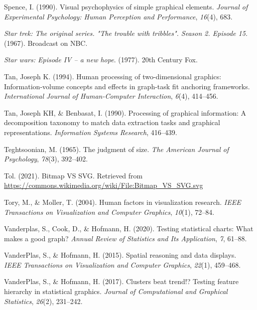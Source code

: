 \documentclass[print]{nuthesis}
\newlength{\cslhangindent}
\newenvironment{CSLReferences}[2]%
{\setlength{\parindent}{0pt}%
\everypar{\setlength{\hangindent}{\cslhangindent}}\ignorespaces}%
{\par}
\begin{document}
\begin{CSLReferences}{1}{0}
\leavevmode{}%
Spence, I. (1990). Visual psychophysics of simple graphical elements. \emph{Journal of Experimental Psychology: Human Perception and Performance}, \emph{16}(4), 683.

\leavevmode{}%
\emph{Star trek: The original series. "The trouble with tribbles". Season 2. Episode 15.} (1967). Broadcast on NBC.

\leavevmode{}%
\emph{Star wars: Episode IV -- a new hope}. (1977). 20th Century Fox.

\leavevmode{}%
Tan, Joseph K. (1994). Human processing of two-dimensional graphics: Information-volume concepts and effects in graph-task fit anchoring frameworks. \emph{International Journal of Human-Computer Interaction}, \emph{6}(4), 414--456.

\leavevmode{}%
Tan, Joseph KH, \& Benbasat, I. (1990). Processing of graphical information: A decomposition taxonomy to match data extraction tasks and graphical representations. \emph{Information Systems Research}, 416--439.

\leavevmode{}%
Teghtsoonian, M. (1965). The judgment of size. \emph{The American Journal of Psychology}, \emph{78}(3), 392--402.

\leavevmode{}%
Tol. (2021). Bitmap VS SVG. Retrieved from \url{https://commons.wikimedia.org/wiki/File:Bitmap_VS_SVG.svg}

\leavevmode{}%
Tory, M., \& Moller, T. (2004). Human factors in visualization research. \emph{IEEE Transactions on Visualization and Computer Graphics}, \emph{10}(1), 72--84.

\leavevmode{}%
Vanderplas, S., Cook, D., \& Hofmann, H. (2020). Testing statistical charts: What makes a good graph? \emph{Annual Review of Statistics and Its Application}, \emph{7}, 61--88.

\leavevmode{}%
VanderPlas, S., \& Hofmann, H. (2015). Spatial reasoning and data displays. \emph{IEEE Transactions on Visualization and Computer Graphics}, \emph{22}(1), 459--468.

\leavevmode{}%
VanderPlas, S., \& Hofmann, H. (2017). Clusters beat trend!? Testing feature hierarchy in statistical graphics. \emph{Journal of Computational and Graphical Statistics}, \emph{26}(2), 231--242.


\end{CSLReferences}
\end{document}

